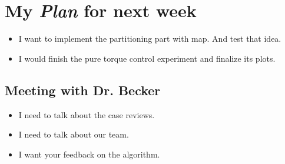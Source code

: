 \section{My \emph{Plan} for next week}

\begin{itemize}
\item I want to implement the partitioning part with map. And test that idea.
\item I would finish the pure torque control experiment and finalize its plots.
\end{itemize}

\subsection{Meeting with Dr. Becker  }

\begin{itemize}
\item I need to talk about the case reviews.
\item I need to talk about our team.
\item I want your feedback on the algorithm.
\end{itemize}


